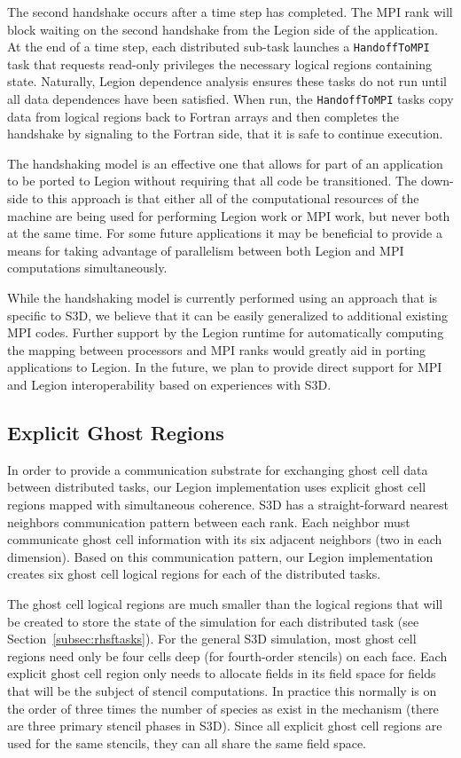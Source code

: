 The second handshake occurs after a time step
has completed.  The MPI rank will block waiting
on the second handshake from the Legion side of
the application. At the end of a time step, each
distributed sub-task launches a {\tt HandoffToMPI}
task that requests read-only privileges the necessary
logical regions containing state. Naturally, Legion
dependence analysis ensures these tasks do not run
until all data dependences have been satisfied.
When run, the {\tt HandoffToMPI} tasks copy data
from logical regions back to Fortran arrays and
then completes the handshake by signaling to the 
Fortran side, that it is safe to continue execution.

The handshaking model is an effective one that 
allows for part of an application to be ported to
Legion without requiring that all code be transitioned.
The down-side to this approach is that either all
of the computational resources of the machine are
being used for performing Legion work or MPI work,
but never both at the same time. For some future
applications it may be beneficial to provide a means
for taking advantage of parallelism between both 
Legion and MPI computations simultaneously.

While the handshaking model is currently performed
using an approach that is specific to S3D, we believe
that it can be easily generalized to additional 
existing MPI codes. Further support by the Legion
runtime for automatically computing the mapping 
between processors and MPI ranks would greatly aid
in porting applications to Legion. In the future,
we plan to provide direct support for MPI and 
Legion interoperability based on experiences with S3D.

\subsection{Explicit Ghost Regions}
\label{subsec:s3dghost}
In order to provide a communication substrate for
exchanging ghost cell data between distributed tasks,
our Legion implementation uses explicit ghost cell
regions mapped with simultaneous coherence. S3D has
a straight-forward nearest neighbors communication
pattern between each rank. Each neighbor must 
communicate ghost cell information with its six
adjacent neighbors (two in each dimension). Based
on this communication pattern, our Legion implementation
creates six ghost cell logical regions for each of
the distributed tasks. 

The ghost cell logical regions are much smaller than 
the logical regions that will be created to store 
the state of the simulation for each distributed 
task (see Section~\ref{subsec:rhsftasks}). For the
general S3D simulation, most ghost cell regions need
only be four cells deep (for fourth-order stencils)
on each face. Each explicit ghost cell region only
needs to allocate fields in its field space for
fields that will be the subject of stencil 
computations. In practice this normally is on the 
order of three times the number of species as exist
in the mechanism (there are three primary stencil 
phases in S3D). Since all explicit ghost cell regions
are used for the same stencils, they can all share
the same field space.

